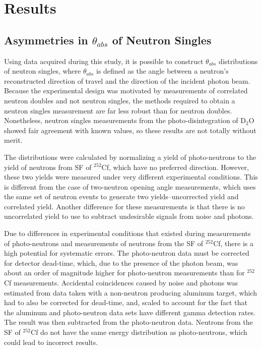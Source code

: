\chapter{Results}
\section{Asymmetries in $\theta_{abs}$ of Neutron Singles}
Using data acquired during this study, it is possible to construct $\theta_{abs}$ distributions of neutron singles, where $\theta_{abs}$ is defined as the angle between a neutron's reconstructed direction of travel and the direction of the incident photon beam.
Because the experimental design was motivated by measurements of correlated neutron doubles and not neutron singles, the methods required to obtain a neutron singles measurement are far less robust than for neutron doubles.
Nonetheless, neutron singles measurements from the photo-disintegration of D$_{2}$O showed fair agreement with known values, so these results are not totally without merit.

The distributions were calculated by normalizing a yield of photo-neutrons to the yield of neutrons from SF of $^{252}$Cf, which have no preferred direction.
However, these two yields were measured under very different experimental conditions.
This is different from the case of two-neutron opening angle measurements, which uses the same set of neutron events to generate two yields--uncorrected yield and correlated yield.
Another difference for these measurements is that there is no uncorrelated yield to use to subtract undesirable signals from noise and photons.

 Due to differences in experimental conditions that existed during measurements of photo-neutrons and measurements of neutrons from the SF of $^{252}$Cf, there is a high potential for systematic errors.
The photo-neutron data must be corrected for detector dead-time, which, due to the presence of the photon beam, was about an order of magnitude higher for photo-neutron measurements than for $^{252}$Cf measurements.
Accidental coincidences caused by noise and photons was estimated from data taken with a non-neutron producing aluminum target, which had to also be corrected for dead-time, and, scaled to account for the fact that the aluminum and photo-neutron data sets have different gamma detection rates.
The result was then subtracted from the photo-neutron data.
Neutrons from the SF of $^{252}$Cf do not have the same energy distribution as photo-neutrons, which could lead to incorrect results.

